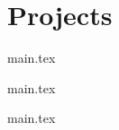 \section{Projects}
    \vspace{-5pt}
    \resumeSubHeadingListStart
        {main.tex}
        \vspace{-13pt}

        {main.tex}
        \vspace{-13pt}

        {main.tex}
        \vspace{-13pt}

    \resumeSubHeadingListEnd
\vspace{-14pt}
